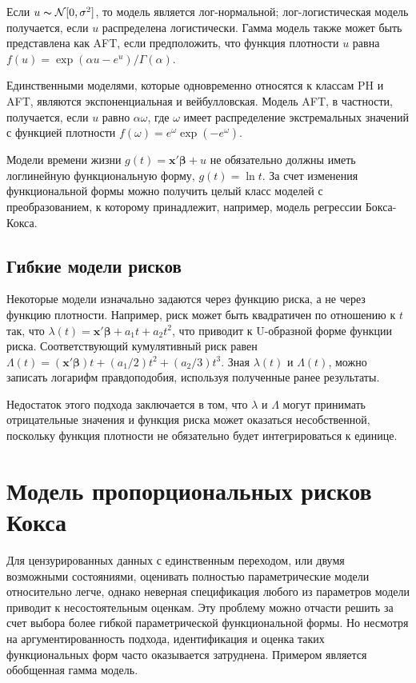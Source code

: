 Если $u\thicksim\mathcal{N}[0,\sigma^2]$, то модель является лог-нормальной; лог-логистическая модель получается, если $u$ распределена логистически. Гамма модель также может быть представлена как AFT, если предположить, что функция плотности $u$ равна $f(u)=\exp(\alpha u-e^u)/\Gamma(\alpha)$.

Единственными моделями, которые одновременно относятся к классам PH и AFT, являются экспоненциальная и вейбулловская. Модель AFT, в частности, получается, если $u$ равно $\alpha\omega$, где $\omega$ имеет распределение экстремальных значений с функцией плотности $f(\omega)=e^{\omega}\exp(-e^\omega)$.

Модели времени жизни $g(t)=\mathbf{x}'\bm{\beta}+u$ не обязательно должны иметь логлинейную функциональную форму, $g(t)=\ln t$. За счет изменения функциональной формы можно получить целый класс моделей с преобразованием, к которому принадлежит, например, модель регрессии Бокса-Кокса.


\subsection{Гибкие модели рисков}\label{sec:17.7.3} %

\noindent
Некоторые модели изначально задаются через функцию риска, а не через функцию плотности. Например, риск может быть квадратичен по отношению к $t$ так, что $\lambda(t)=\mathbf{x}'\bm{\beta}+a_1t+a_2t^2$, что приводит к U-образной форме функции риска. Соответствующий кумулятивный риск равен $\Lambda(t)=(\mathbf{x}'\bm{\beta})t+(a_1/2)t^2+(a_2/3)t^3$. Зная $\lambda(t)$ и $\Lambda(t)$, можно записать логарифм правдоподобия, используя полученные ранее результаты.

Недостаток этого подхода заключается в том, что $\lambda$ и $\Lambda$ могут принимать отрицательные значения и функция риска может оказаться несобственной, поскольку функция плотности не обязательно будет интегрироваться к единице.




\section{Модель пропорциональных рисков Кокса}\label{sec:17.8}

\noindent
Для цензурированных данных с единственным переходом, или двумя возможными состояниями, оценивать полностью параметрические модели относительно легче, однако неверная спецификация любого из параметров модели приводит к несостоятельным оценкам. Эту проблему можно отчасти решить за счет выбора более гибкой параметрической функциональной формы. Но несмотря на аргументированность %
подхода, идентификация и оценка таких функциональных форм часто оказывается затруднена. Примером является обобщенная гамма модель.

